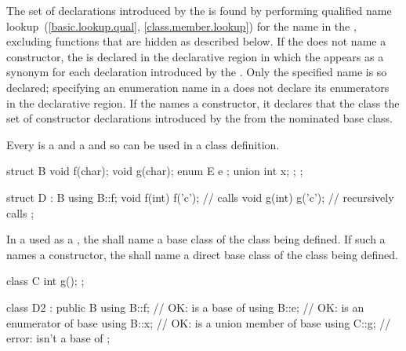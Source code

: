 The set of declarations introduced by the  is found by
performing qualified name lookup~(\ref{basic.lookup.qual}, \ref{class.member.lookup})
for the name in the ,
excluding functions that are hidden as described below.
If the  does not name a constructor,
the  is declared in the declarative region
in which the  appears
as a synonym for each declaration introduced by the .
\enternote Only the specified name is so declared;
specifying an enumeration name in a 
does not declare its enumerators
in the  declarative region.
\exitnote
{}%
If the  names a constructor,
it declares that the class  the set of constructor declarations
introduced by the  from the nominated base class.

\pnum
Every  is a  and a
 and so can be used in a class definition.
\enterexample

\begin{codeblock}
struct B {
  void f(char);
  void g(char);
  enum E { e };
  union { int x; };
};

struct D : B {
  using B::f;
  void f(int) { f('c'); }       // calls 
  void g(int) { g('c'); }       // recursively calls 
};
\end{codeblock}
\exitexample

\pnum
In a  used as a
, the 
shall name a base class of the class being defined. If such a
 names a constructor, the
 shall name a direct base class of the class
being defined.
\enterexample

\begin{codeblock}
class C {
  int g();
};

class D2 : public B {
  using B::f;                   // OK:  is a base of 
  using B::e;                   // OK:  is an enumerator of base 
  using B::x;                   // OK:  is a union member of base 
  using C::g;                   // error:  isn't a base of 
};
\end{codeblock}
\exitexample

